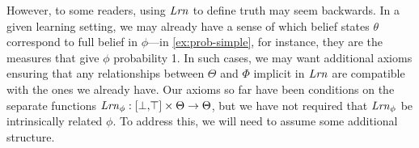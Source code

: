 %
However, to some readers, using $\mathit{Lrn}$ to define truth may seem backwards.
In a given learning setting, we may already have a sense of
which belief states $\theta$ correspond to full belief in $\phi$---in \cref{ex:prob-simple}, for instance, 
	they are the measures that give $\phi$ probability 1.
In such cases, we may want additional axioms ensuring that 
	any relationships between $\Theta$ and $\Phi$ implicit in $\mathit{Lrn}$
	are compatible with the ones we already have. 
Our axioms so far have been conditions on the separate functions
	$
	\mathit{Lrn}_\phi : [\bot,\!\top] \times \Theta \to \Theta
	$, 
	but we have not required that $\mathit{Lrn}_\phi$ be intrinsically related $\phi$. 
To address this, we will need to assume some additional structure.


